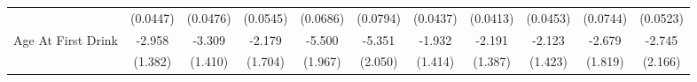 {\begin{tabular}{l*{10}{c}}
            &    (0.0447)         &    (0.0476)         &    (0.0545)         &    (0.0686)         &    (0.0794)         &    (0.0437)         &    (0.0413)         &    (0.0453)         &    (0.0744)         &    (0.0523)         \\
\addlinespace
Age At First Drink&      -2.958\sym{*}  &      -3.309\sym{*}  &      -2.179         &      -5.500\sym{**} &      -5.351\sym{**} &      -1.932         &      -2.191         &      -2.123         &      -2.679         &      -2.745         \\
            &     (1.382)         &     (1.410)         &     (1.704)         &     (1.967)         &     (2.050)         &     (1.414)         &     (1.387)         &     (1.423)         &     (1.819)         &     (2.166)         \\
\bottomrule
\end{tabular}
}
